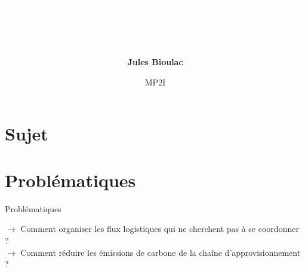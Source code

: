 \documentclass[8pt, aspectratio=169]{beamer}
\title{\textcolor{white}{\textbf{Réduction des émissions de carbone des flux logistiques}}\vspace{30pt}}
\author{\textbf{Jules Bioulac}}
\date{MP2I}
\begin{document}
\section{Sujet}
\begin{frame}
\vspace{0pt}
\makeatletter
      \hspace*{-35pt}
      \begin{minipage}[c][\textheight]{\textwidth}
        \maketitle
      \end{minipage}
\end{frame}



\section{Problématiques}
\begin{frame}{\insertsubsection}{Problématiques}
\makeatletter
      \begin{minipage}[c][\textheight]{\textwidth}
        \begin{large}
            $\longrightarrow$ Comment organiser les flux logistiques qui ne cherchent pas à se coordonner ?\\
            \newline
            $\longrightarrow$ Comment réduire les émissions de carbone  de la chaîne d'approvisionnement ?
        \end{large}
      \end{minipage}
\end{frame}


\end{document}
